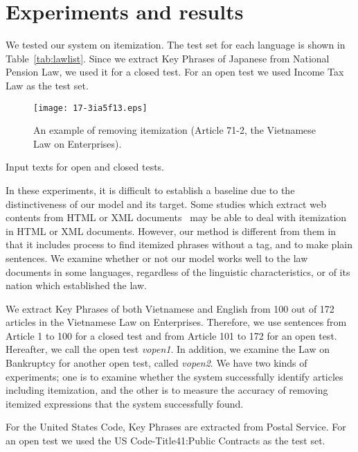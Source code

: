 \documentclass[english]{jnlp_1.4}
\begin{document}
\section{Experiments and results}\label{sec:exp}

We tested our system on itemization.  The test set for each language is
shown in Table~\ref{tab:lawlist}.  
Since we extract Key Phrases of Japanese from National Pension Law, we
used it for a closed test.  
For an open test we used Income Tax Law as the test set.

\begin{figure}[b]
\begin{center}
\texttt{[image: 17-3ia5f13.eps]}
\end{center}
 \caption{An example of removing itemization 
(Article 71-2, the Vietnamese Law on Enterprises).}
 \label{fig:itemize_eng}
\end{figure}
\begin{table}[b]
\caption{Input texts for open and closed tests.}
\label{tab:lawlist}

\end{table}



In these experiments, it is difficult to establish a baseline due to
the distinctiveness of our model and its target.
Some studies which extract web contents from HTML or XML
documents~\cite{bing} may be able to deal with itemization in HTML
or XML documents.
However, our method is different from them in that it includes 
process to find itemized phrases without a tag, and to make plain
sentences.
We examine whether or not our model works well to the law documents
in some languages, regardless of the linguistic characteristics, or of
its nation which established the law.



We extract Key Phrases of both Vietnamese and English from 100 out of
172 articles in the Vietnamese Law on Enterprises.
Therefore, we use sentences from Article 1 to 100 for a closed test and
from Article 101 to 172 for an open test.
Hereafter, we call the open test {\it vopen1}.
In addition, we examine the Law on Bankruptcy for another open test, called
{\it vopen2}.
We have two kinds of experiments; one is to examine whether the system
successfully identify articles including itemization, and the other is
to measure the accuracy of removing itemized expressions that the system
successfully found.

For the United States Code, Key Phrases are extracted from Postal
Service.
For an open test we used the US Code-Title41:Public Contracts as the test set.
\end{document}
